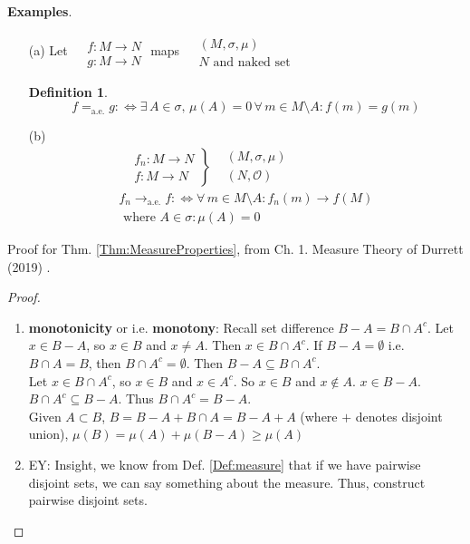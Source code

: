 \documentclass[10pt]{amsart}
\newtheorem{definition}{Definition}
\begin{document}
\begin{multicols*}{2}
\textbf{Examples}. 
\begin{enumerate}
	\item[(a)]
Let $\begin{aligned} & \quad \\
	& f: M \to N \\
	& g: M \to N \end{aligned}$ maps $\begin{aligned} & (M, \sigma, \mu) \\
	& N \text{ and naked set } \end{aligned}$
\begin{definition}
	\[
	f =_{\text{a.e.}} g : \Longleftrightarrow \exists \, A \in \sigma, \, \mu(A) = 0 \, \forall \, m \in M \setminus A : f(m) = g(m) 
	\]
\end{definition}
\item[(b)] 
\[
\begin{gathered}
	\left. \begin{aligned} & f_n: M \to N \\
		& f: M \to N \end{aligned}
\right\}  \begin{aligned} & (M, \sigma, \mu) \\ & (N, \mathcal{O}) \end{aligned} \\
f_n \to_{\text{a.e.} } f : \Longleftrightarrow \forall \, m \in M \setminus A: f_n(m) \to f(M) \\
\text{ where } A \in \sigma : \mu(A) = 0
\end{gathered}
\]
\end{enumerate}

Proof for Thm. \ref{Thm:MeasureProperties}, from Ch. 1. Measure Theory of Durrett (2019) \cite{Durr2019}.

\begin{proof}
\begin{enumerate}
	\item \textbf{monotonicity} or i.e. \textbf{monotony}: Recall set difference $B-A = B \cap A^c$. Let $x \in B-A$, so $x\in B$ and $x\neq A$. Then $x\in B \cap A^c$. If $B-A = \emptyset$ i.e. $B\cap A = B$, then $B\cap A^c = \emptyset$. Then $B-A \subseteq B \cap A^c$. \\
	Let $x\in B\cap A^c$, so $x\in B$ and $x\in A^c$. So $x\in B$ and $x\notin A$. $x\in B-A$. $B\cap A^c \subseteq B-A$. Thus $B\cap A^c = B-A$. \\
	
	Given $A\subset B$, $B=B-A + B\cap A = B-A + A$ (where $+$ denotes disjoint union), $\mu(B) = \mu (A) + \mu(B-A) \geq \mu(A)$
	\item EY: Insight, we know from Def. \ref{Def:measure} that if we have pairwise disjoint sets, we can say something about the measure. Thus, construct pairwise disjoint sets. \\
	

\end{enumerate}
\end{proof}
\end{multicols*}
\end{document}
